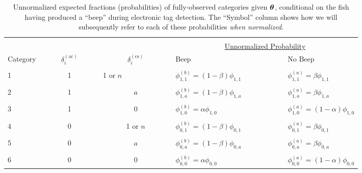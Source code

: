 \documentclass[11pt]{article}
\def\bm#1{\mathpalette\bmstyle{#1}}
\def\bmstyle#1#2{\mbox{\boldmath$#1#2$}}
\newcommand{\btheta}{\bm{\theta}}
\begin{document}
\begin{table}
\caption{Unnormalized expected fractions (probabilities) of fully-observed categories given $\btheta$, conditional
on the fish having produced a ``beep'' during electronic tag detection.  The ``Symbol'' column shows
how we will subsequently refer to each of these probabilities {\em when normalized}. \label{tab:probs} }
\begin{center}
\begin{tabular}{lccll}
\hline \hline\\
 &  &   &   \multicolumn{2}{c}{\underline{Unnormalized Probability}} \\
Category&~~~~~$\delta_i^{(\mathrm{ac})}$~~~~~      &      ~~~~~$\delta_i^{(\mathrm{cs})}$~~~~~     &   Beep~~~~~   &  No Beep         \\\hline
\\
1 & 1 &  1 or $n$~~~~~~~~~~~~~  &  $\phi^{(b)}_{1,1}=(1-\beta)\phi_{1,1}$~~~~~~~~~~~ &  $\phi^{(a)}_{1,1}=\beta\phi_{1,1}$\\
\\
2 & 1 &  $a$  &  $\phi_{1,a}^{(b)}=(1-\beta)\phi_{1,a}$  &  $\phi_{1,a}^{(a)}=\beta\phi_{1,a}$ \\ 
\\
3 & 1 &  0  &  $\phi_{1,0}^{(b)}=\alpha\phi_{1,0}$   &  $\phi_{1,0}^{(a)}=(1-\alpha)\phi_{1,0}$ \\
\\
4 & 0 &  1 or $n$  &  $\phi_{0,1}^{(b)}=(1-\beta)\phi_{0,1}$   &  $\phi_{0,1}^{(a)}=\beta\phi_{0,1}$ \\
\\
5 & 0 &  $a$  &  $\phi_{0,a}^{(b)}=(1-\beta)\phi_{0,a}$   &  $\phi_{0,a}^{(a)}=\beta\phi_{0,a}$  \\ 
\\
6 & 0 &  0  &  $\phi_{0,0}^{(b)}=\alpha\phi_{0,0}$    &  $\phi_{0,0}^{(a)}=(1-\alpha)\phi_{0,0}$  \\
\hline\hline
\end{tabular}
\end{center}
\end{table}
\end{document}
